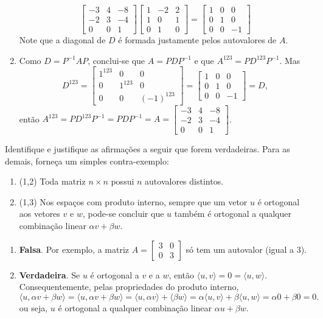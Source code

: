 \documentclass[12pt,a4paper]{article}
\begin{document}
\begin{ExerciseList}
\begin{enumerate}
\[\begin{bmatrix}
-3 & 4 & -8\\
-2 & 3 & -4\\
 0 & 0 &  1
\end{bmatrix}
\begin{bmatrix}
1 & -2 & 2\\
1 &  0 & 1\\
0 &  1 & 0
\end{bmatrix}
=
\begin{bmatrix}
1 & 0 & 0\\
0 & 1 & 0\\
0 & 0 & -1
\end{bmatrix}
\]
Note que a diagonal de $D$ é formada justamente pelos autovalores de $A$.
\item Como $D = P^{-1} A P$, conclui-se que $A = P D P^{-1}$ e que $A^{123}= P D^{123} P^{-1}$. Mas
\[
D^{123}
=
\begin{bmatrix}
1^{123} & 0 & 0\\
0 & 1^{123} & 0\\
0 & 0 & (-1)^{123}
\end{bmatrix}
=
\begin{bmatrix}
1 & 0 & 0\\
0 & 1 & 0\\
0 & 0 & -1
\end{bmatrix}
= D,
\]
então $A^{123} = P D^{123} P^{-1} = P D P^{-1} = A =
\begin{bmatrix}
-3 & 4 & -8\\
-2 & 3 & -4\\
 0 & 0 &  1
\end{bmatrix}$.
\end{enumerate}


\Exercise[title={2,5}] Identifique e justifique as afirmações a seguir que forem verdadeiras. Para as demais, forneça um simples contra-exemplo:
\begin{enumerate}
\item (1,2) Toda matriz $n \times n$ possui $n$ autovalores distintos.
\item (1,3) Nos espaços com produto interno, sempre que um vetor $u$ é ortogonal aos vetores $v$ e $w$, pode-se concluir que $u$ também é ortogonal a qualquer combinação linear $\alpha v + \beta w$.
\end{enumerate}
\Answer
\begin{enumerate}
\item \textbf{Falsa}. Por exemplo, a matriz $A = \begin{bmatrix}
3 & 0 \\ 0 & 3
\end{bmatrix}$ só tem um autovalor (igual a $3$).
\item \textbf{Verdadeira}. Se $u$ é ortogonal a $v$ e a $w$, então $\langle u, v \rangle = 0 = \langle u, w \rangle$. Consequentemente, pelas propriedades do produto interno,
\[
  \langle u, \alpha v + \beta w \rangle
= \langle u, \alpha v + \beta w \rangle
= \langle u, \alpha v \rangle + \langle \beta w \rangle
= \alpha \langle u, v \rangle + \beta \langle u,w \rangle
= \alpha 0 + \beta 0
= 0.
\]
ou seja, $u$ é ortogonal a qualquer combinação linear $\alpha u + \beta w$.
\end{enumerate}



\end{ExerciseList}
\end{document}
